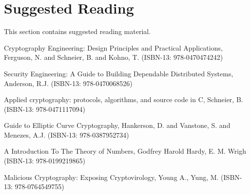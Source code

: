 \chapter{Suggested Reading}
\label{cha:suggested-reading}
This section contains suggested reading material.

\begin{itemize*}
	\item Cryptography Engineering: Design Principles and Practical Applications, Ferguson, N. and Schneier, B. and Kohno, T. (ISBN-13: 978-0470474242)
	\item Security Engineering: A Guide to Building Dependable Distributed Systems, Anderson, R.J. (ISBN-13: 978-0470068526)
	\item Applied cryptography: protocols, algorithms, and source code in C, Schneier, B. (ISBN-13: 978-0471117094)
	\item Guide to Elliptic Curve Cryptography, Hankerson, D. and Vanstone, S. and Menezes, A.J. (ISBN-13: 978-0387952734)
	\item A Introduction To The Theory of Numbers, Godfrey Harold Hardy, E. M. Wrigh (ISBN-13: 978-0199219865)
	\item Malicious Cryptography: Exposing Cryptovirology, Young A., Yung, M. (ISBN-13: 978-0764549755)
\end{itemize*}

